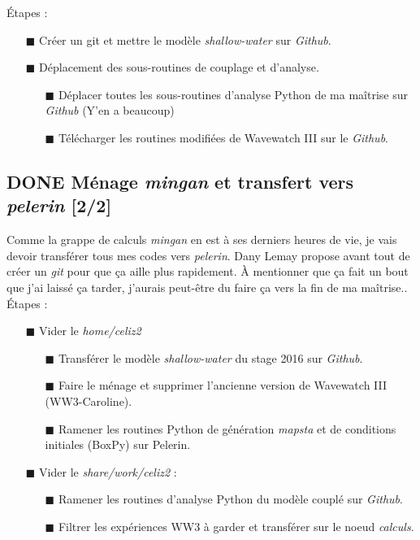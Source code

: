 \documentclass[10pt]{article}
\numberwithin{equation}{section}
\renewcommand{\boxtimes}{\blacksquare}
\begin{document}
Étapes : 
\begin{itemize}
\item[{$\boxtimes$}] Créer un git et mettre le modèle \emph{shallow-water} sur \emph{Github}.
\item[{$\boxtimes$}] Déplacement des sous-routines de couplage et d'analyse.
\begin{itemize}
\item[{$\boxtimes$}] Déplacer toutes les sous-routines d'analyse Python de ma maîtrise sur \emph{Github} (Y'en a beaucoup)
\item[{$\boxtimes$}] Télécharger les routines modifiées de Wavewatch III sur le \emph{Github}.
\end{itemize}
\end{itemize}
\subsection{{\bfseries\sffamily DONE} Ménage \emph{mingan} et transfert vers \emph{pelerin} [2/2]}
\label{sec:orgd1385ad}
Comme la grappe de calculs \emph{mingan} en est à ses derniers heures de vie, je vais devoir transférer tous mes codes vers \emph{pelerin}.
Dany Lemay propose avant tout de créer un \emph{git} pour que ça aille plus rapidement.
À mentionner que ça fait un bout que j'ai laissé ça tarder, j'aurais peut-être du faire ça vers la fin de ma maîtrise..\\

Étapes : 
\begin{itemize}
\item[{$\boxtimes$}] Vider le \emph{home/celiz2}
\begin{itemize}
\item[{$\boxtimes$}] Transférer le modèle \emph{shallow-water} du stage 2016 sur \emph{Github}.
\item[{$\boxtimes$}] Faire le ménage et supprimer l'ancienne version de Wavewatch III (WW3-Caroline).
\item[{$\boxtimes$}] Ramener les routines Python de génération \emph{mapsta} et de conditions initiales (BoxPy) sur Pelerin.
\end{itemize}
\item[{$\boxtimes$}] Vider le \emph{share/work/celiz2} :
\begin{itemize}
\item[{$\boxtimes$}] Ramener les routines d'analyse Python du modèle couplé sur \emph{Github}.
\item[{$\boxtimes$}] Filtrer les expériences WW3 à garder et transférer sur le noeud \emph{calculs}.
\end{itemize}
\end{itemize}
\end{document}
